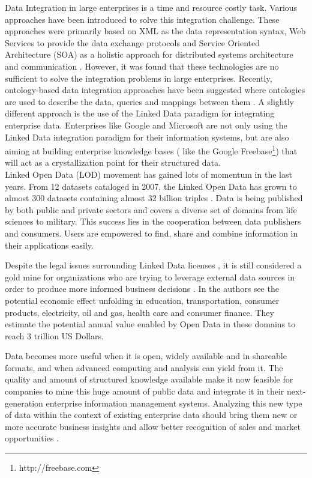 \documentclass[onecolumn, crcready]{iosart2c}
\begin{document}
Data Integration in large enterprises is a time and resource costly task. Various approaches have been introduced to solve this integration challenge. These approaches were primarily based on XML as the data representation syntax, Web Services to provide the data exchange protocols and Service Oriented Architecture (SOA) as a holistic approach for distributed systems architecture and communication \cite{frischmuth2103a}\cite{frischmuth2012linked}. However, it was found that these technologies are no sufficient to solve the integration problems in large enterprises. Recently, ontology-based data integration approaches have been suggested where ontologies are used to describe the data, queries and mappings between them \cite{Wache01ontology-basedintegration}. A slightly different approach is the use of the Linked Data paradigm \cite{bizer_linked_2009} for integrating enterprise data. Enterprises like Google and Microsoft are not only using the Linked Data integration paradigm for their information systems, but are also aiming at building enterprise knowledge bases ( like the Google Freebase\footnote{http://freebase.com}) that will act as a crystallization point for their structured data.\\

Linked Open Data (LOD) movement has gained lots of momentum in the last years. From 12 datasets cataloged in 2007, the Linked Open Data has grown to almost 300 datasets containing almost 32 billion triples \cite{bizer2011}. Data is being published by both public and private sectors and covers a diverse set of domains from life sciences to military. This success lies in the cooperation between data publishers and consumers. Users are empowered to find, share and combine information in their applications easily. 

Despite the legal issues surrounding Linked Data licenses \cite{nomoneyLOD}, it is still considered a gold mine for organizations who are trying to leverage external data sources in order to produce more informed business decisions \cite{Boyd2011}. In \cite{mckinseyreport} the authors see the potential economic effect unfolding in education, transportation, consumer products, electricity, oil and gas, health care and consumer finance. They estimate the potential annual value enabled by Open Data in these domains to reach 3 trillion US Dollars. 

Data becomes more useful when it is open, widely available and in shareable formats, and when advanced computing and analysis can yield from it. The quality and amount of structured knowledge available make it now feasible for companies to mine this huge amount of public data and integrate it in their next-generation enterprise information management systems. Analyzing this new type of data within the context of existing enterprise data should bring them new or more accurate business insights and allow better recognition of sales and market opportunities \cite{bigData}. 
\end{document}

